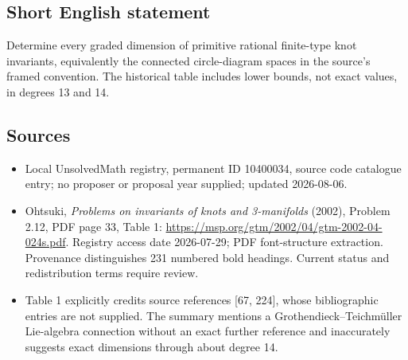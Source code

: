 \documentclass[11pt]{article}
\begin{document}
\subsection{Short English statement}
Determine every graded dimension of primitive rational finite-type knot invariants, equivalently the connected circle-diagram spaces in the source's framed convention. The historical table includes lower bounds, not exact values, in degrees 13 and 14.
\subsection{Sources}
\begin{itemize}
\item Local UnsolvedMath registry, permanent ID 10400034, source code catalogue entry; no proposer or proposal year supplied; updated 2026-08-06.
\item Ohtsuki, \emph{Problems on invariants of knots and 3-manifolds} (2002), Problem 2.12, PDF page 33, Table 1: \url{https://msp.org/gtm/2002/04/gtm-2002-04-024s.pdf}. Registry access date 2026-07-29; PDF font-structure extraction. Provenance distinguishes 231 numbered bold headings. Current status and redistribution terms require review.
\item Table 1 explicitly credits source references [67, 224], whose bibliographic entries are not supplied. The summary mentions a Grothendieck--Teichm\"uller Lie-algebra connection without an exact further reference and inaccurately suggests exact dimensions through about degree 14.
\end{itemize}
\end{document}
